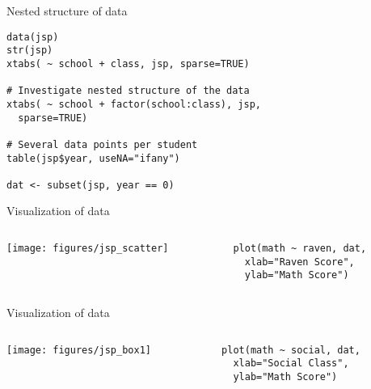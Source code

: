 \documentclass{beamer}
\begin{document}
{

\begin{frame}[fragile]{Nested structure of data}
  \begin{lstlisting}
data(jsp)
str(jsp)
xtabs( ~ school + class, jsp, sparse=TRUE)

# Investigate nested structure of the data
xtabs( ~ school + factor(school:class), jsp,
  sparse=TRUE)

# Several data points per student
table(jsp$year, useNA="ifany")

dat <- subset(jsp, year == 0)
  \end{lstlisting}
\end{frame}

}

\begin{frame}[fragile]{Visualization of data}
  \begin{columns}
    \begin{column}{6cm}
      \texttt{[image: figures/jsp\_scatter]}
    \end{column}
    \begin{column}{4cm}
      \begin{lstlisting}[style=plain]
plot(math ~ raven, dat,
  xlab="Raven Score", 
  ylab="Math Score")
      \end{lstlisting}
    \end{column}
  \end{columns}
\end{frame}

\begin{frame}[fragile]{Visualization of data}
  \begin{columns}
    \begin{column}{6cm}
      \texttt{[image: figures/jsp\_box1]}
    \end{column}
    \begin{column}{4cm}
      \begin{lstlisting}[style=plain]
plot(math ~ social, dat,
  xlab="Social Class",
  ylab="Math Score")
      \end{lstlisting}
    \end{column}
  \end{columns}
\end{frame}
\end{document}
